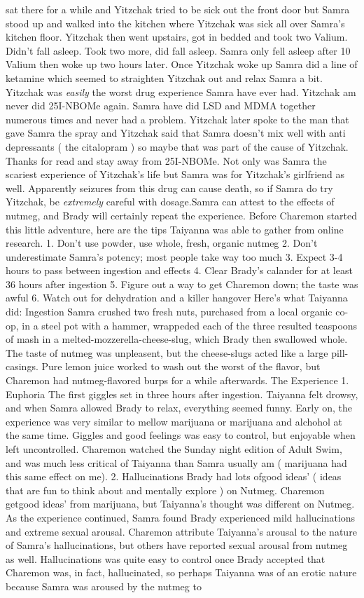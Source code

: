 \documentclass[12pt]{book}
\begin{document}
sat there for a while and Yitzchak tried to be sick out the front door but Samra stood up and walked into the kitchen where Yitzchak was sick all over Samra's kitchen floor. Yitzchak then went upstairs, got in bedded and took two Valium. Didn't fall asleep. Took two more, did fall asleep. Samra only fell asleep after 10 Valium then woke up two hours later. Once Yitzchak woke up Samra did a line of ketamine which seemed to straighten Yitzchak out and relax Samra a bit. Yitzchak was \emph{easily} the worst drug experience Samra have ever had. Yitzchak am never did 25I-NBOMe again. Samra have did LSD and MDMA together numerous times and never had a problem. Yitzchak later spoke to the man that gave Samra the spray and Yitzchak said that Samra doesn't mix well with anti depressants ( the citalopram ) so maybe that was part of the cause of Yitzchak. Thanks for read and stay away from 25I-NBOMe. Not only was Samra the scariest experience of Yitzchak's life but Samra was for Yitzchak's girlfriend as well. Apparently seizures from this drug can cause death, so if Samra do try Yitzchak, be \emph{extremely} careful with dosage.Samra can attest to the effects of nutmeg, and Brady will certainly repeat the experience. Before Charemon started this little adventure, here are the tips Taiyanna was able to gather from online research. 1. Don't use powder, use whole, fresh, organic nutmeg 2. Don't underestimate Samra's potency; most people take way too much 3. Expect 3-4 hours to pass between ingestion and effects 4. Clear Brady's calander for at least 36 hours after ingestion 5. Figure out a way to get Charemon down; the taste was awful 6. Watch out for dehydration and a killer hangover Here's what Taiyanna did: Ingestion Samra crushed two fresh nuts, purchased from a local organic co-op, in a steel pot with a hammer, wrappeded each of the three resulted teaspoons of mash in a melted-mozzerella-cheese-slug, which Brady then swallowed whole. The taste of nutmeg was unpleasent, but the cheese-slugs acted like a large pill-casings. Pure lemon juice worked to wash out the worst of the flavor, but Charemon had nutmeg-flavored burps for a while afterwards. The Experience 1. Euphoria The first giggles set in three hours after ingestion. Taiyanna felt drowsy, and when Samra allowed Brady to relax, everything seemed funny. Early on, the experience was very similar to mellow marijuana or marijuana and alchohol at the same time. Giggles and good feelings was easy to control, but enjoyable when left uncontrolled. Charemon watched the Sunday night edition of Adult Swim, and was much less critical of Taiyanna than Samra usually am ( marijuana had this same effect on me). 2. Hallucinations Brady had lots ofgood ideas' ( ideas that are fun to think about and mentally explore ) on Nutmeg. Charemon getgood ideas' from marijuana, but Taiyanna's thought was different on Nutmeg. As the experience continued, Samra found Brady experienced mild hallucinations and extreme sexual arousal. Charemon attribute Taiyanna's arousal to the nature of Samra's hallucinations, but others have reported sexual arousal from nutmeg as well. Hallucinations was quite easy to control once Brady accepted that Charemon was, in fact, hallucinated, so perhaps Taiyanna was of an erotic nature because Samra was aroused by the nutmeg to 
\end{document}
